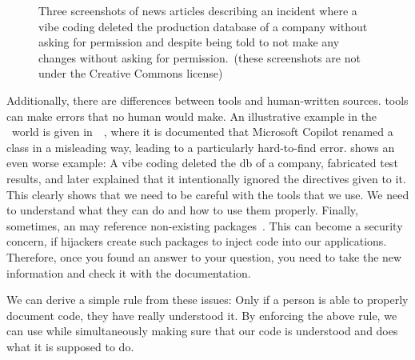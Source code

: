 %
\begin{figure}%
\centering%
\begin{noglslink}%
%
%
%
\floatSep%
%
%
%
\floatRowSep%
%
%
%
\caption{Three screenshots of news articles describing an incident where a vibe coding  deleted the production database of a company without asking for permission and despite being told to not make any changes without asking for permission.~(these screenshots are not under the Creative Commons license)}%
\label{fig:aiDBdelete}%
\end{noglslink}%
\end{figure}%
%
Additionally, there are differences between  tools and human-written sources.
 tools can make errors that no human would make.
An illustrative example in the \python\ world is given in~~\cite{BSHETB:VSK2025CIC}, where it is documented that Microsoft Copilot renamed a class in a misleading way, leading to a particularly hard-to-find error.
 shows an even worse example:
A vibe coding  deleted the \gls{db} of a company, fabricated test results, and later explained that it intentionally ignored the directives given to it.
This clearly shows that we need to be careful with the tools that we use.
We need to understand what they can do and how to use them properly.
Finally, sometimes, an  may reference non-existing packages~\cite{AT:G2025AGCCBADFTSSCHW}.
This can become a security concern, if hijackers create such packages to inject code into our applications.
Therefore, once you found an answer to your question, you need to take the new information and check it with the documentation.

We can derive a simple rule from these issues:%
%
%
%
Only if a person is able to properly document code, they have really understood it.
By enforcing the above rule, we can use  while simultaneously making sure that our code is understood and does what it is supposed to do.

